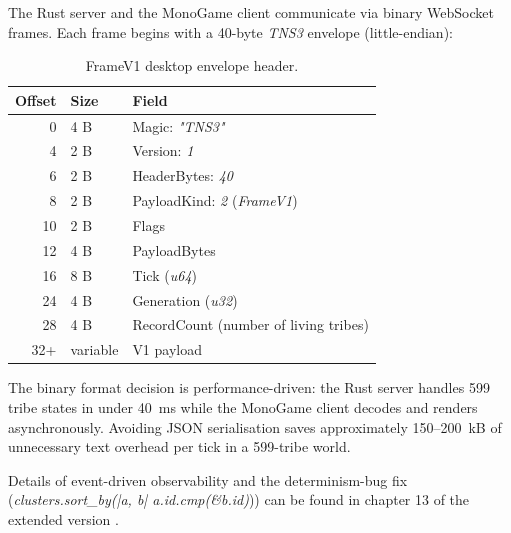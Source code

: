 The Rust server and the MonoGame client communicate via binary WebSocket frames. Each frame begins with a 40-byte \textit{TNS3} envelope (little-endian):

\begin{table}[H]
\centering
\caption{FrameV1 desktop envelope header.}
\label{tab:framev1-envelope}
\begin{tabular}{|r|l|l|}
\hline
\textbf{Offset} & \textbf{Size} & \textbf{Field} \\
\hline
0  & 4 B & Magic: \textit{"TNS3"} \\
4  & 2 B & Version: \textit{1} \\
6  & 2 B & HeaderBytes: \textit{40} \\
8  & 2 B & PayloadKind: \textit{2} (\textit{FrameV1}) \\
10 & 2 B & Flags \\
12 & 4 B & PayloadBytes \\
16 & 8 B & Tick (\textit{u64}) \\
24 & 4 B & Generation (\textit{u32}) \\
28 & 4 B & RecordCount (number of living tribes) \\
32+ & variable & V1 payload \\
\hline
\end{tabular}
\end{table}

The binary format decision is performance-driven: the Rust server handles 599 tribe states in under 40~ms while the MonoGame client decodes and renders asynchronously. Avoiding JSON serialisation saves approximately 150--200~kB of unnecessary text overhead per tick in a 599-tribe world.

Details of event-driven observability and the determinism-bug fix (\textit{clusters.sort\_by(|a, b| a.id.cmp(\&b.id)})) can be found in chapter 13 of the extended version \cite{premadegraph-full}.
